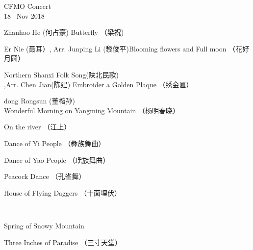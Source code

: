 \documentclass[letter,6pt,poets]{ConcProg}
\begin{document}
\begin{programme}{
    CFMO Concert
\\  {\normalsize 18 ~Nov 2018}
}
  \begin{part}[]
    \begin{composition}{Zhanhao He (何占豪) }{}{Butterfly （梁祝)}{}
    \end{composition}
    \begin{composition}{Er Nie (聂耳）, Arr. Junping Li (黎俊平)}{}{Blooming flowers and Full moon （花好月圆）}{}      
    \end{composition}
    
    \begin{composition}{Northern Shanxi Folk Song(陕北民歌)\\,Arr. Chen Jian(陈建)} {}{Embroider a Golden Plaque  （绣金匾）}{}
    \end{composition}
    \begin{composition}{dong Rongsun (董榕孙)} {}{Wonderful Morning on Yangming Mountain  （杨明春晓）
}{}
    \end{composition}
    \begin{composition}{} {}{On the river  （江上）}{}
    \end{composition}
    \begin{composition}{}{}{Dance of Yi People  （彝族舞曲）}{}
    \end{composition}
    \begin{composition}{}{}{Dance of Yao People  （瑶族舞曲）}{}
    \end{composition}
    \begin{composition}{}{}{Peacock Dance  （孔雀舞） }{}
    \end{composition}
    \begin{composition}{}{}{House of Flying Daggers  （十面埋伏）}{}
    \end{composition}\\
    \begin{composition}{}{}{Spring of Snowy Mountain   }{}
    \end{composition}
    \begin{composition}{}{}{Three Inches of Paradise  （三寸天堂）}{}

\end{composition}
\end{part}
\end{programme}
\end{document}
